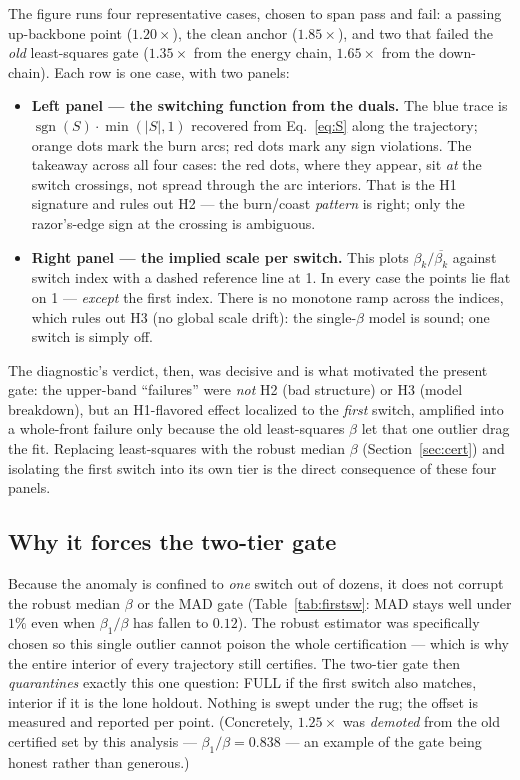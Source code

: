 \documentclass[11pt]{article}
\begin{document}
The figure runs four representative cases, chosen to span pass and fail: a
passing up-backbone point ($1.20\times$), the clean anchor ($1.85\times$), and
two that failed the \emph{old} least-squares gate ($1.35\times$ from the energy
chain, $1.65\times$ from the down-chain). Each row is one case, with two panels:

\begin{itemize}
\item \textbf{Left panel --- the switching function from the duals.} The blue
trace is $\operatorname{sgn}(S)\cdot\min(|S|,1)$ recovered from
Eq.~\eqref{eq:S} along the trajectory; orange dots mark the burn arcs; red dots
mark any sign violations. The takeaway across all four cases: the red dots, where
they appear, sit \emph{at} the switch crossings, not spread through the arc
interiors. That is the H1 signature and rules out H2 --- the burn/coast
\emph{pattern} is right; only the razor's-edge sign at the crossing is
ambiguous.
\item \textbf{Right panel --- the implied scale per switch.} This plots
$\beta_k/\overline{\beta_k}$ against switch index with a dashed reference line at
1. In every case the points lie flat on 1 --- \emph{except} the first index.
There is no monotone ramp across the indices, which rules out H3 (no global scale
drift): the single-$\beta$ model is sound; one switch is simply off.
\end{itemize}

\noindent The diagnostic's verdict, then, was decisive and is what motivated the
present gate: the upper-band ``failures'' were \emph{not} H2 (bad structure) or
H3 (model breakdown), but an H1-flavored effect localized to the \emph{first}
switch, amplified into a whole-front failure only because the old least-squares
$\beta$ let that one outlier drag the fit. Replacing least-squares with the
robust median $\beta$ (Section~\ref{sec:cert}) and isolating the first switch into
its own tier is the direct consequence of these four panels.

\subsection{Why it forces the two-tier gate}

Because the anomaly is confined to \emph{one} switch out of dozens, it does not
corrupt the robust median $\beta$ or the MAD gate (Table~\ref{tab:firstsw}: MAD
stays well under $1\%$ even when $\beta_1/\beta$ has fallen to $0.12$). The
robust estimator was specifically chosen so this single outlier cannot poison
the whole certification --- which is why the entire interior of every trajectory
still certifies. The two-tier gate then \emph{quarantines} exactly this one
question: FULL if the first switch also matches, interior if it is the lone
holdout. Nothing is swept under the rug; the offset is measured and reported per
point. (Concretely, $1.25\times$ was \emph{demoted} from the old certified set by
this analysis --- $\beta_1/\beta=0.838$ --- an example of the gate being honest
rather than generous.)
\end{document}
